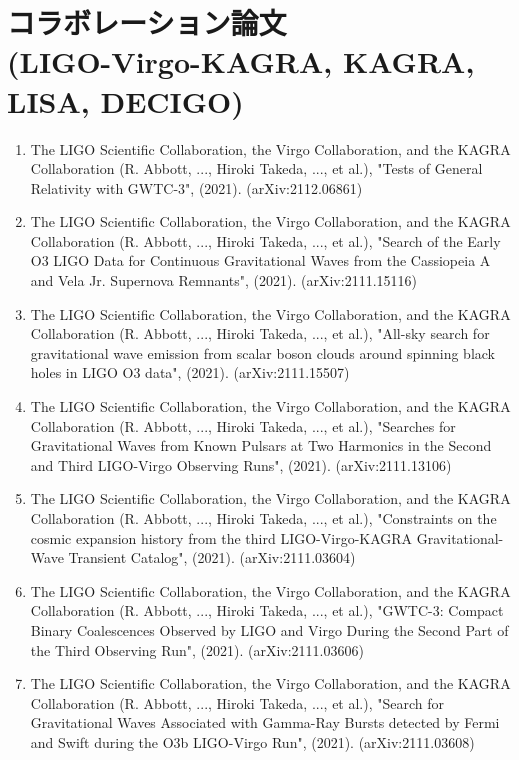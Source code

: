 \documentclass[uplatex, 12pt,a4paper]{jsarticle}
\begin{document}
\section*{コラボレーション論文 \\(LIGO-Virgo-KAGRA, KAGRA, LISA, DECIGO)}
\begin{enumerate}

\item The LIGO Scientific Collaboration, the Virgo Collaboration, and the KAGRA Collaboration (R. Abbott, ..., Hiroki Takeda, ..., et al.), "Tests of General Relativity with GWTC-3", (2021). (arXiv:2112.06861)

\item The LIGO Scientific Collaboration, the Virgo Collaboration, and the KAGRA Collaboration (R. Abbott, ..., Hiroki Takeda, ..., et al.), "Search of the Early O3 LIGO Data for Continuous Gravitational Waves from the Cassiopeia A and Vela Jr. Supernova Remnants", (2021). (arXiv:2111.15116)

\item The LIGO Scientific Collaboration, the Virgo Collaboration, and the KAGRA Collaboration (R. Abbott, ..., Hiroki Takeda, ..., et al.), "All-sky search for gravitational wave emission from scalar boson clouds around spinning black holes in LIGO O3 data", (2021). (arXiv:2111.15507)

\item The LIGO Scientific Collaboration, the Virgo Collaboration, and the KAGRA Collaboration (R. Abbott, ..., Hiroki Takeda, ..., et al.), "Searches for Gravitational Waves from Known Pulsars at Two Harmonics in the Second and Third LIGO-Virgo Observing Runs", (2021). (arXiv:2111.13106)



\item The LIGO Scientific Collaboration, the Virgo Collaboration, and the KAGRA Collaboration (R. Abbott, ..., Hiroki Takeda, ..., et al.), "Constraints on the cosmic expansion history from the third LIGO-Virgo-KAGRA Gravitational-Wave Transient Catalog", (2021). (arXiv:2111.03604)

\item The LIGO Scientific Collaboration, the Virgo Collaboration, and the KAGRA Collaboration (R. Abbott, ..., Hiroki Takeda, ..., et al.), "GWTC-3: Compact Binary Coalescences Observed by LIGO and Virgo During the Second Part of the Third Observing Run", (2021). (arXiv:2111.03606)

\item The LIGO Scientific Collaboration, the Virgo Collaboration, and the KAGRA Collaboration (R. Abbott, ..., Hiroki Takeda, ..., et al.), "Search for Gravitational Waves Associated with Gamma-Ray Bursts detected by Fermi and Swift during the O3b LIGO-Virgo Run", (2021). (arXiv:2111.03608) 


\end{enumerate}
\end{document}
